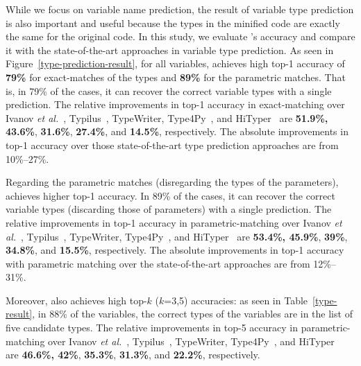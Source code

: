 
While we focus on variable name prediction, the result of variable
type prediction is also important and useful because the types in the
minified code are exactly the same for the original code.  In this
study, we evaluate {\tool}'s accuracy and compare it with the
state-of-the-art approaches in variable type prediction. As seen in
Figure~\ref{type-prediction-result}, for all variables, {\tool}
achieves high top-1 accuracy of {\bf 79\%} for exact-matches of the
types and {\bf 89\%} for the parametric matches. That is, in 79\% of
the cases, it can recover the correct variable types with a single
prediction.
%
The relative improvements in top-1 accuracy in exact-matching over
Ivanov {\em et al.}~\cite{ivanov21predicting},
Typilus~\cite{typilus-pldi20}, TypeWriter\cite{typewriter-fse20},
Type4Py~\cite{Type4Py-icse22}, and HiTyper~\cite{HiTyper-icse22} are
{\bf 51.9\%, 43.6\%}, {\bf 31.6\%}, {\bf 27.4\%}, and {\bf
  14.5\%}, respectively. The absolute improvements in top-1 accuracy
over those state-of-the-art type prediction approaches are from
10\%--27\%.

Regarding the parametric matches (disregarding the types of the
parameters), {\tool} achieves higher top-1 accuracy. In 89\% of the
cases, it can recover the correct variable types (discarding those of
parameters) with a single prediction. The relative improvements in
top-1 accuracy in parametric-matching over Ivanov {\em et
  al.}~\cite{ivanov21predicting}, Typilus~\cite{typilus-pldi20},
TypeWriter\cite{typewriter-fse20}, Type4Py~\cite{Type4Py-icse22}, and
HiTyper~\cite{HiTyper-icse22} are {\bf 53.4\%, 45.9\%}, {\bf 39\%},
{\bf 34.8\%}, and {\bf 15.5\%}, respectively. The absolute
improvements in top-1 accuracy with parametric matching over the
state-of-the-art approaches are from 12\%--31\%.

Moreover, {\tool} also achieves high top-$k$ ($k$=3,5) accuracies: as
seen in Table~\ref{type-result}, in 88\% of the variables, the correct
types of the variables are in the list of five candidate types. The
relative improvements in top-5 accuracy in parametric-matching over
Ivanov {\em et al.}~\cite{ivanov21predicting},
Typilus~\cite{typilus-pldi20}, TypeWriter\cite{typewriter-fse20},
Type4Py~\cite{Type4Py-icse22}, and HiTyper~\cite{HiTyper-icse22} are
{\bf 46.6\%, 42\%}, {\bf 35.3\%}, {\bf 31.3\%}, and {\bf 22.2\%},
respectively.

